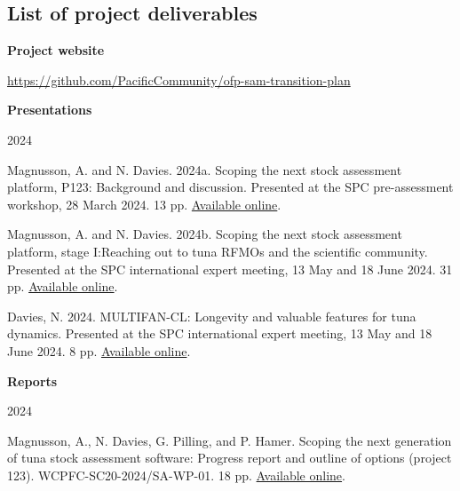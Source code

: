 \documentclass{SCreport}
\begin{document}
\newpage

\subsection{List of project deliverables}
\label{sec:deliverables}

\vspace{1.5ex}

\textbf{Project website}

\href{https://github.com/PacificCommunity/ofp-sam-transition-plan}
{https://github.com/PacificCommunity/ofp-sam-transition-plan}

\vspace{2ex}

\textbf{Presentations}

2024

\begin{description}\setlength\itemsep{0ex}
  \item Magnusson, A. and N. Davies. 2024a. Scoping the next stock assessment
  platform, P123: Background and discussion. Presented at the SPC pre-assessment
  workshop, 28 March 2024. 13 pp.
  \href{https://github.com/PacificCommunity/ofp-sam-transition-plan/blob/main/presentations/2024_03_28_paw_scoping/2024_03_28_paw_scoping.pdf}
  {Available online}.
  \item Magnusson, A. and N. Davies. 2024b. Scoping the next stock assessment
  platform, stage I:\linebreak Reaching out to tuna RFMOs and the scientific
  community. Presented at the SPC international expert meeting, 13 May and 18
  June 2024. 31 pp.
  \href{https://github.com/PacificCommunity/ofp-sam-transition-plan/blob/main/presentations/2024_05_13_experts_scoping/2024_05_13_experts_scoping.pdf}
  {Available online}.
  \item Davies, N. 2024. MULTIFAN-CL: Longevity and valuable features for tuna
  dynamics. Presented at the SPC international expert meeting, 13 May and 18
  June 2024. 8 pp.
  \href{https://github.com/PacificCommunity/ofp-sam-transition-plan/blob/main/presentations/2024_05_13_mfcl_future/MULTIFAN-CL_future.pdf}
  {Available online}.
\end{description}

\vspace{2ex}

\textbf{Reports}

2024

\begin{description}\setlength\itemsep{0ex}
  \item Magnusson, A., N. Davies, G. Pilling, and P. Hamer. Scoping the next
  generation of tuna stock assessment software: Progress report and outline of
  options (project 123). WCPFC-SC20-2024/SA-WP-01. 18 pp.
  \href{https://github.com/PacificCommunity/ofp-sam-transition-plan/blob/main/documents/2024_08_14_wcpfc_manila/p123_progress_report_sc20.pdf}
  {Available online}.
\end{description}
\end{document}
